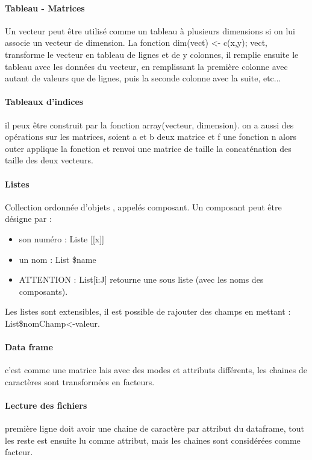 \documentclass{article}
\begin{document}
\paragraph{Tableau - Matrices} Un vecteur peut être utilisé comme un tableau à plusieurs dimensions si on lui associe un vecteur de dimension. La fonction dim(vect) <- c(x,y); vect, transforme le vecteur en tableau de lignes et de y colonnes, il remplie ensuite le tableau avec les données du vecteur, en remplissant la première colonne avec autant de valeurs que de lignes, puis la seconde colonne avec la suite, etc...
\paragraph{Tableaux d'indices} il peux être construit par la fonction array(vecteur, dimension). on a aussi des opérations sur les matrices, soient a et b deux matrice et f une fonction n alors outer applique la fonction et renvoi une matrice de taille la concaténation des taille des deux vecteurs.
\paragraph{Listes} Collection ordonnée d'objets , appelés composant. Un composant peut être désigne par : \begin{itemize}
\item son numéro : Liste [[x]]
\item un nom : List \$name
\item ATTENTION : List[i:J] retourne une sous liste (avec les noms des composants).
\end{itemize}
Les listes sont extensibles, il est possible de rajouter des champs en mettant : List\$nomChamp<-valeur.
\paragraph{Data frame} c'est comme une matrice lais avec des modes et attributs différents, les chaines de caractères sont transformées en facteurs.
\paragraph{Lecture des fichiers} première ligne doit avoir une chaine de caractère par attribut du dataframe, tout les reste est ensuite lu comme attribut, mais les chaines sont considérées comme facteur.
\newpage
\end{document}

